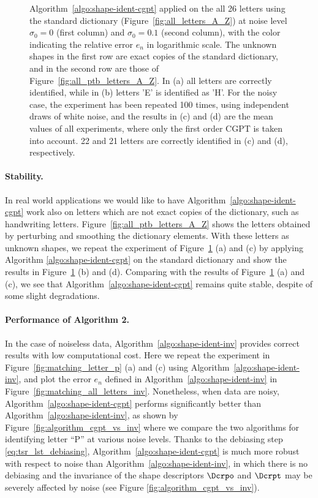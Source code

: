 \begin{figure}[htp]
  \caption{Algorithm~\ref{algo:shape-ident-cgpt} applied on the all 26
    letters using the standard dictionary
    (Figure~\ref{fig:all_letters_A_Z}) at noise level $\sigma_0=0$
    (first column) and $\sigma_0=0.1$ (second column), with the color
    indicating the relative error $e_n$ in logarithmic scale. The
    unknown shapes in the first row are exact copies of the standard
    dictionary, and in the second row are those of
    Figure~\ref{fig:all_ptb_letters_A_Z}. In (a) all letters are
    correctly identified, while in (b) letters 'E' is identified as
    'H'. For the noisy case, the experiment has been repeated 100
    times, using independent draws of white noise, and the results in
    (c) and (d) are the mean values of all experiments, where only the
    first order CGPT is taken into account. 22 and 21 letters
    are correctly identified in (c) and (d), respectively.}
  \label{fig:matching_all_letters}
\end{figure}

\paragraph{Stability.}
In real world applications we would like to have
Algorithm~\ref{algo:shape-ident-cgpt} work also on letters which
are not exact copies of the dictionary, such as handwriting
letters. Figure~\ref{fig:all_ptb_letters_A_Z} shows the letters
obtained by perturbing and smoothing the dictionary elements. With
these letters as unknown shapes, we repeat the experiment of
Figure~\ref{fig:matching_all_letters} (a) and (c) by applying
Algorithm \ref{algo:shape-ident-cgpt} on the standard dictionary
and show the results in Figure~\ref{fig:matching_all_letters} (b)
and (d). Comparing with the results of
Figure~\ref{fig:matching_all_letters} (a) and (c), we see that
Algorithm~\ref{algo:shape-ident-cgpt} remains quite stable,
despite of some slight degradations.

\paragraph{Performance of Algorithm 2.}
In the case of noiseless data,
Algorithm~\ref{algo:shape-ident-inv} provides correct results with
low computational cost. Here we repeat the experiment in
Figure~\ref{fig:matching_letter_p} (a) and (c) using
Algorithm~\ref{algo:shape-ident-inv}, and plot the error $e_n$
defined in Algorithm~\ref{algo:shape-ident-inv} in
Figure~\ref{fig:matching_all_letters_inv}. Nonetheless, when data
are noisy, Algorithm~\ref{algo:shape-ident-cgpt} performs
significantly better than Algorithm~\ref{algo:shape-ident-inv}, as
shown by Figure~\ref{fig:algorithm_cgpt_vs_inv} where we compare
the two algorithms for identifying letter ``P'' at various noise
levels. Thanks to the debiasing step \eqref{eq:tsr_lst_debiasing},
Algorithm~\ref{algo:shape-ident-cgpt} is much more robust with
respect to noise than Algorithm~\ref{algo:shape-ident-inv}, in
which there is no debiasing and the invariance of the shape
descriptors $\Dcrpo$ and $\Dcrpt$ may be severely affected by
noise (see Figure \ref{fig:algorithm_cgpt_vs_inv}).

